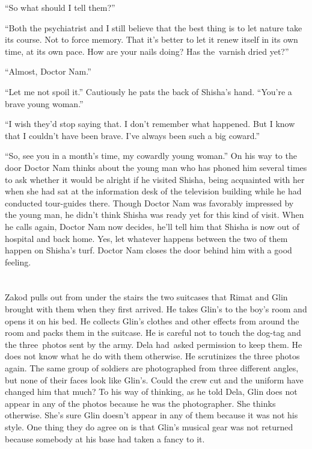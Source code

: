 \documentclass[twoside,11pt,openany]{book}
\begin{document}
``So what should I tell them?''

``Both the psychiatrist and I still believe that the best thing is to let nature take its course. Not to
force memory. That it's better to let it renew itself in its own time, at its own pace. How are your nails doing? Has
the~varnish dried yet?''

``Almost, Doctor Nam.''

``Let me not spoil it.'' Cautiously he pats the back of Shisha's hand. ``You're a
brave young woman.''

``I wish they'd stop saying that. I don't remember what happened. But I know that I couldn't have been
brave. I've always been such a big coward.''

``So, see you in a month's time, my cowardly young woman.'' On his way to the door Doctor
Nam thinks about the young man who has phoned him several times to ask whether it would be alright if he visited
Shisha, being acquainted with her when she had sat at the information desk of the television building while he had
conducted tour-guides there. Though Doctor Nam was favorably impressed by the young man, he didn't think Shisha was
ready yet for this kind of visit. When he calls again, Doctor Nam now decides, he'll tell him that Shisha is now out of
hospital and back home. Yes, let whatever happens between the two of them happen on Shisha's turf. Doctor Nam closes
the door behind him with a good feeling.


\bigskip

\chapter{}

Zakod pulls out from under the stairs the two suitcases that Rimat and Glin brought with them when they first arrived.
He takes Glin's to the boy's room and opens it on his bed. He collects Glin's clothes and other effects from around the
room and packs them in the suitcase. He is careful not to touch the dog-tag and the three~photos sent by the army. Dela
had~asked permission to keep them.
He does not know what he do with them otherwise.
He scrutinizes the three
photos again. The same group of soldiers are photographed from three different angles, but none of their faces look
like Glin's. Could the crew cut and the uniform have changed him that much?  To his way of thinking, as he told
Dela, Glin does not appear in any of the photos because he was the photographer. She thinks otherwise. She's sure Glin
doesn't appear in any of them because it was not his style.  One thing they do agree on is that Glin's musical gear
was not returned because somebody at his base had taken a fancy to it.
\end{document}
